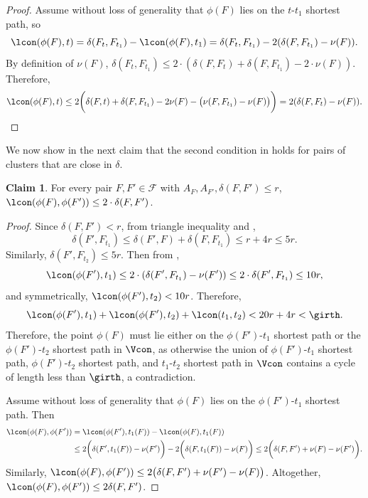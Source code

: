 \documentclass[11pt]{article}
\theoremstyle{definition}
\newtheorem{claim}[theorem]{Claim}
\newcommand{\fset}{{\mathcal{F}}}
\begin{document}
\begin{titlepage}
\begin{proof}
Assume without loss of generality that $\phi(F)$ lies on the $t$-${t_1}$ shortest path, so 
$$\lcon(\phi(F),t) = \delta(F_t,F_{t_1}) - \lcon (\phi(F),{t_1}) = \delta(F_t,F_{t_1}) - 2(\delta(F,F_{t_1}) - \nu(F)).$$ By definition of $\nu(F)$, $\delta(F_t,F_{t_1}) \le 2\cdot (\delta(F,F_t)+\delta(F,F_{t_1}) - 2\cdot\nu(F))$. Therefore, $$\lcon(\phi(F),t) \le 2\bigg(\delta(F,t)+\delta(F,F_{t_1}) - 2\nu(F) - \big(\nu(F,F_{t_1}) -\nu(F)\big)\bigg) = 2(\delta(F,F_t)-\nu(F)).$$
    \end{proof}


We now show in the next claim that the second condition in  holds for pairs of clusters that are close in $\delta$.

\begin{claim} \label{clm:g-close}
For every pair $F,F'\in \fset$ with $A_{F}, A_{F'},\delta(F,F') \le r$,  $\lcon(\phi(F),\phi(F')) \le 2\cdot\delta(F,F')$. 
    \end{claim}

\begin{proof}
Since $\delta(F,F') < r$, from triangle inequality and , 
$$\delta(F',F_{t_1})\le \delta(F',F)+\delta(F,F_{t_1})\le r+4r\le 5r.$$ 
Similarly, $\delta(F',F_{t_2})\le 5r$. 
Then from , 
$$\lcon(\phi(F'),t_1) \le 2\cdot (\delta(F',F_{t_1}) - \nu(F')) \le 2\cdot \delta(F',F_{t_1}) \le  10r,$$ 
and symmetrically, $\lcon(\phi(F'),t_2) < 10r$. Therefore, $$\lcon(\phi(F'),t_1)+\lcon(\phi(F'),t_2)+\lcon(t_1,t_2) < 20r + 4r < \girth.$$
Therefore, the point $\phi(F)$ must lie either on the $\phi(F')$-$t_1$ shortest path or the $\phi(F')$-$t_2$ shortest path in $\Vcon$, as otherwise the union of $\phi(F')$-${t_1}$ shortest path, $\phi(F')$-${t_2}$ shortest path, and $t_1$-${t_2}$ shortest path in $\Vcon$ contains a cycle of length less than $\girth$, a contradiction. 

Assume without loss of generality that $\phi(F)$ lies on the $\phi(F')$-$t_1$ shortest path. Then
\[
\begin{split}
\lcon(\phi(F),\phi(F')) & =\lcon(\phi(F'),t_1(F))-\lcon(\phi(F),t_1(F))\\ 
& \le 2\bigg(\delta(F',t_1(F))-\nu(F')\bigg) - 2\bigg(\delta(F,t_1(F))-\nu(F)\bigg) \le 2\bigg(\delta(F,F')+\nu(F)-\nu(F')\bigg).
\end{split}
\]  
Similarly, $\lcon(\phi(F),\phi(F')) \le 2\big(\delta(F,F')+\nu(F')-\nu(F)\big)$. Altogether, $\lcon(\phi(F),\phi(F')) \le 2\delta(F,F')$.
\end{proof}



\end{titlepage}
\end{document}
